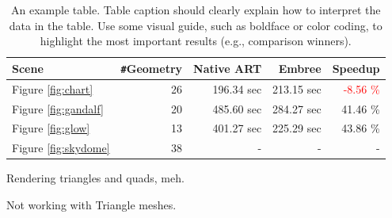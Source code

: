 \begin{table}
	\centering
	{\footnotesize\sf
		\begin{tabular}{lrrrr}
			\toprule
			Scene & \Verb!#!Geometry & Native ART & Embree & Speedup \\ 
			\midrule
			Figure \ref{fig:chart} & 26 & 196.34 sec & 213.15 sec & \textcolor{red}{-8.56 \%} \\
			Figure \ref{fig:gandalf} & 20 & 485.60 sec & 284.27 sec & 41.46 \% \\
			Figure \ref{fig:glow} & 13 & 401.27 sec & 225.29 sec & 43.86 \%  \\
			Figure \ref{fig:skydome} & 38 & - & - & - \\
			\bottomrule
	\end{tabular}}
	\caption{An example table. Table caption should clearly explain how to interpret the data in the table. Use some visual guide, such as boldface or color coding, to highlight the most important results (e.g., comparison winners).}
	\label{tab:scenes}
\end{table}


Rendering triangles and quads, meh.

Not working with Triangle meshes.

